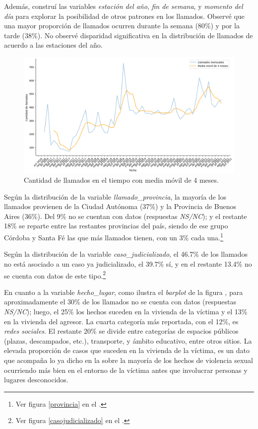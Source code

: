 \documentclass[10 pt]{article}
\begin{document}
Además, construí las variables \textit{estación del año}, \textit{fin de semana}, y \textit{momento del día} para explorar la posibilidad de otros patrones en los llamados. Observé que una mayor proporción de llamados ocurren durante la semana (80\%) y por la tarde (38\%). No observé disparidad significativa en la distribución de llamados de acuerdo a las estaciones del año.

\begin{figure}[H]
    \begin{center}
    \includegraphics[scale=.5]{images/latex_trend_llamados.png}
    \caption{Cantidad de llamados en el tiempo con media móvil de 4 meses.}
    \label{trend}
    \end{center}
    \end{figure}




Según la distribución de la variable \textit{llamado\_provincia}, la mayoría de los llamados provienen de la Ciudad Autónoma (37\%) y la Provincia de Buenos Aires (36\%). Del 9\% no se cuentan con datos (respuestas \textit{NS/NC}); y el restante 18\% se reparte entre las restantes provincias del país, siendo de ese grupo Córdoba y Santa Fé las que más llamados tienen, con un 3\% cada una.\footnote{Ver figura \ref{provincia} en el .}

Según la distribución de la variable \textit{caso\_judicializado}, el 46.7\% de los llamados no está asociado a un caso ya judicializado, el 39.7\% sí, y en el restante 13.4\% no se cuenta con datos de este tipo.\footnote{Ver figura \ref{casojudicializado} en el .} 

En cuanto a la variable \textit{hecho\_lugar}, como ilustra el \textit{barplot} de la figura , para aproximadamente el 30\% de los llamados no se cuenta con datos (respuestas \textit{NS/NC}); luego, el 25\% los hechos suceden en la vivienda de la víctima y el 13\% en la vivienda del agresor. La cuarta categoría más reportada, con el 12\%, es \textit{redes sociales}. El restante 20\% se divide entre categorías de espacios públicos (plazas, descampados, etc.), transporte, y ámbito educativo, entre otros sitios. La elevada proporción de casos que suceden en la vivienda de la víctima, es un dato que acompaña lo ya dicho en la  sobre la mayoría de los hechos de violencia sexual ocurriendo más bien en el entorno de la víctima antes que involucrar personas y lugares desconocidos. 
\end{document}
